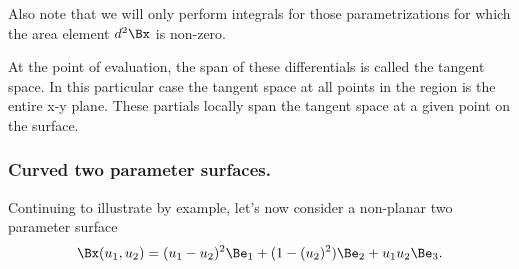 Also note that we will only perform integrals for those parametrizations for which the area element \( d^2 \Bx \) is non-zero.




At the point of evaluation, the span of these differentials is called the tangent space.
In this particular case the tangent space at all points in the region is the entire x-y plane.
These partials locally span the tangent space at a given point on the surface.

\subsubsection{Curved two parameter surfaces.}

Continuing to illustrate by example, let's now consider a non-planar two parameter surface
\begin{dmath}\label{eqn:curvilinearDefined:560}
\Bx(u_1, u_2) =
(u_1-u_2)^2
\Be_1
+ (1-(u_2)^2 ) \Be_2
+ u_1 u_2 \Be_3.
\end{dmath}

